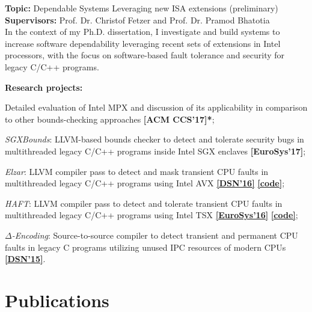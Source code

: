 \documentclass[letterpaper]{article}
\renewenvironment{itemize}{
  \begin{list}{}{
    \setlength{\leftmargin}{1.5em}
  }
}{
  \end{list}
}
\begin{document}
\begin{itemize}
\item {\bf Topic:} Dependable Systems Leveraging new ISA extensions (preliminary)\\
{\bf Supervisors:} Prof. Dr. Christof Fetzer and Prof. Dr. Pramod Bhatotia\vspace{-13pt}\\

In the context of my Ph.D. dissertation, I investigate and build systems to increase software dependability leveraging recent sets of extensions in Intel processors, with the focus on software-based fault tolerance and security for legacy C/C++ programs. %

{\bf Research projects:}
	\begin{itemize}%
		\item Detailed evaluation of Intel MPX and discussion of its applicability in comparison to other bounds-checking approaches {\bf [ACM CCS'17]*};
		\item \emph{SGXBounds}: LLVM-based bounds checker to detect and tolerate security bugs in multithreaded legacy C/C++ programs inside Intel SGX enclaves {\bf [EuroSys'17]};
		\item \emph{Elzar}: LLVM compiler pass to detect and mask transient CPU faults in multithreaded legacy C/C++ programs using Intel AVX \href{http://se.inf.tu-dresden.de/pubs/papers/Kuvaiskii2016elzar.pdf}{{\bf [DSN'16]}} \href{https://github.com/tudinfse/elzar}{{\bf [code]}};
		\item \emph{HAFT}: LLVM compiler pass to detect and tolerate transient CPU faults in multithreaded legacy C/C++ programs using Intel TSX \href{http://se.inf.tu-dresden.de/pubs/papers/Kuvaiskii2016HAFT.pdf}{{\bf [EuroSys'16]}} \href{https://github.com/tudinfse/haft}{{\bf [code]}};
		\item \emph{$\Delta$-Encoding}: Source-to-source compiler to detect transient and permanent CPU faults in legacy C programs utilizing unused IPC resources of modern CPUs \href{http://se.inf.tu-dresden.de/pubs/papers/DELTAENC.pdf}{{\bf [DSN'15]}}.
	\end{itemize}%
\end{itemize}%


\section*{Publications}
\end{document}
